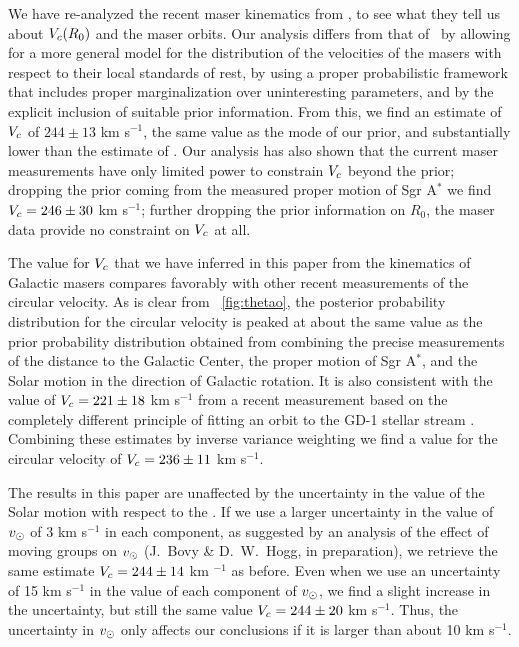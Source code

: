 We have re-analyzed the recent maser kinematics from \reid, to see
what they tell us about $V_c(R_0)$ and the maser orbits. Our analysis
differs from that of \reid\ by allowing for a more general model for
the distribution of the velocities of the masers with respect to their
local standards of rest, by using a proper probabilistic framework
that includes proper marginalization over uninteresting parameters,
and by the explicit inclusion of suitable prior information. From
this, we find an estimate of $V_c$ of $244 \pm 13$ km s$^{-1}$, the
same value as the mode of our prior, and substantially lower than the
estimate of \reid. Our analysis has also shown that the current maser
measurements have only limited power to constrain $V_c$ beyond the
prior; dropping the prior coming from the measured proper motion of
Sgr A$^*$ we find $V_c = 246 \pm 30$ km s$^{-1}$; further dropping the
prior information on $R_0$, the maser data provide no constraint on
$V_c$ at all.

The value for $V_c$ that we have inferred in this paper from the
kinematics of Galactic masers compares favorably with other recent
measurements of the circular velocity. As is clear from
\figurename~\ref{fig:thetao}, the posterior probability distribution
for the circular velocity is peaked at about the same value as the
prior probability distribution obtained from combining the precise
measurements of the distance to the Galactic Center, the proper motion
of Sgr A$^*$, and the Solar motion in the direction of Galactic
rotation. It is also consistent with the value of $V_c = 221 \pm 18$
km s$^{-1}$ from a recent measurement based on the completely
different principle of fitting an orbit to the GD-1 stellar stream
\citep{Koposov09a}. Combining these estimates by inverse variance
weighting we find a value for the circular velocity of $V_c = 236 \pm
11$ km s$^{-1}$.

The results in this paper are unaffected by the uncertainty in the
value of the Solar motion with respect to the \lsr. If we use a larger
uncertainty in the value of $v_\odot$ of 3 km s$^{-1}$ in each
component, as suggested by an analysis of the effect of moving groups
on $v_\odot$ (J.~Bovy \& D.~W.~Hogg, in preparation), we retrieve the
same estimate $V_c = 244 \pm 14$ km $^{-1}$ as before. Even when we
use an uncertainty of 15 km s$^{-1}$ in the value of each component of
$v_\odot$, we find a slight increase in the uncertainty, but still
the same value $V_c = 244 \pm 20$ km s$^{-1}$. Thus, the uncertainty
in $v_\odot$ only affects our conclusions if it is larger than about
10 km s$^{-1}$.

